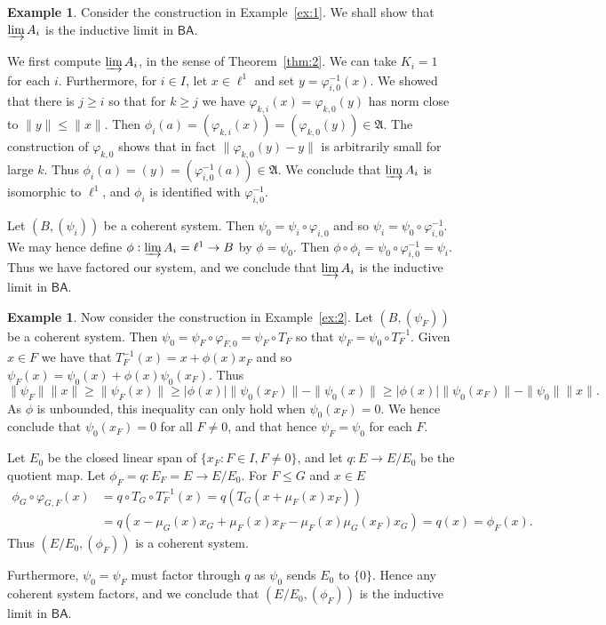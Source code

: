 \documentclass[a4paper,11pt]{article}
\newcommand{\mf}{\mathfrak}
\newcommand{\indlim}{\varinjlim}
\newcommand{\ba}{\textsf{BA}}
\theoremstyle{definition}
\newtheorem{example}[lemma]{Example}
\begin{document}
\begin{example}
Consider the construction in Example~\ref{ex:1}.  We shall show that $\indlim A_i$ is the inductive
limit in $\ba$.

We first compute $\indlim A_i$, in the sense of Theorem~\ref{thm:2}.  We can take $K_i=1$ for each
$i$.  Furthermore, for $i\in I$, let $x\in\ell^1$ and set $y = \varphi_{i,0}^{-1}(x)$.  We showed
that there is $j\geq i$ so that for $k\geq j$ we have $\varphi_{k,i}(x) = \varphi_{k,0}(y)$ has
norm close to $\|y\| \leq \|x\|$.  Then $\phi_i(a) = (\varphi_{k,i}(x)) = (\varphi_{k,0}(y)) \in
\mf A$.  The construction of $\varphi_{k,0}$ shows that in fact $\| \varphi_{k,0}(y)-y\|$ is
arbitrarily small for large $k$.  Thus $\phi_i(a) = (y) = (\varphi_{i,0}^{-1}(a)) \in\mf A$.
We conclude that $\indlim A_i$ is isomorphic to $\ell^1$, and $\phi_i$ is identified with
$\varphi_{i,0}^{-1}$.

Let $(B,(\psi_i))$ be a coherent system.  Then $\psi_0 = \psi_i\circ\varphi_{i,0}$ and so
$\psi_i = \psi_0\circ\varphi_{i,0}^{-1}$.  We may hence define $\phi:\indlim A_i = \ell^1
\rightarrow B$ by $\phi = \psi_0$.  Then $\phi \circ \phi_i = \psi_0 \circ \varphi_{i,0}^{-1} =
\psi_i$.  Thus we have factored our system, and we conclude that $\indlim A_i$ is the inductive
limit in $\ba$.
\end{example}

\begin{example}
Now consider the construction in Example~\ref{ex:2}.  Let $(B,(\psi_F))$ be a coherent system.
Then $\psi_0 = \psi_F \circ \varphi_{F,0} = \psi_F \circ T_F$ so that $\psi_F = \psi_0 \circ
T_F^{-1}$.  Given $x\in F$ we have that $T_F^{-1}(x) = x + \phi(x)x_F$ and so $\psi_F(x)
= \psi_0(x) + \phi(x) \psi_0(x_F)$.  Thus
\[ \|\psi_F\| \|x\| \geq \|\psi_F(x)\| \geq |\phi(x)|\|\psi_0(x_F)\| - \|\psi_0(x)\|
\geq |\phi(x)|\|\psi_0(x_F)\| - \|\psi_0\| \|x\|. \]
As $\phi$ is unbounded, this inequality can only hold when $\psi_0(x_F)=0$.
We hence conclude that $\psi_0(x_F)=0$ for all $F\not=0$, and that hence $\psi_F = \psi_0$ for
each $F$.

Let $E_0$ be the closed linear span of $\{ x_F : F\in I, F\not=0 \}$, and let $q:E\rightarrow E/E_0$
be the quotient map.  Let $\phi_F = q: E_F=E \rightarrow E/E_0$.  For $F\leq G$ and $x\in E$
\begin{align*}
\phi_G \circ \varphi_{G,F}(x) &= q \circ T_G \circ T_F^{-1}(x)
= q(T_G(x + \mu_F(x) x_F)) \\
&= q( x - \mu_G(x)x_G + \mu_F(x) x_F - \mu_F(x)\mu_G(x_F) x_G)
= q(x) = \phi_F(x).
\end{align*}
Thus $(E/E_0,(\phi_F))$ is a coherent system.

Furthermore, $\psi_0 = \psi_F$ must factor through $q$ as $\psi_0$ sends $E_0$ to $\{0\}$.
Hence any coherent system factors, and we conclude that $(E/E_0,(\phi_F))$ is the inductive limit
in $\ba$.
\end{example}
\end{document}
